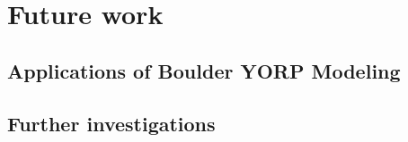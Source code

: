 \chapter{Future work}
\label{future_work}

\section{Applications of Boulder YORP Modeling}

\section{Further investigations}
